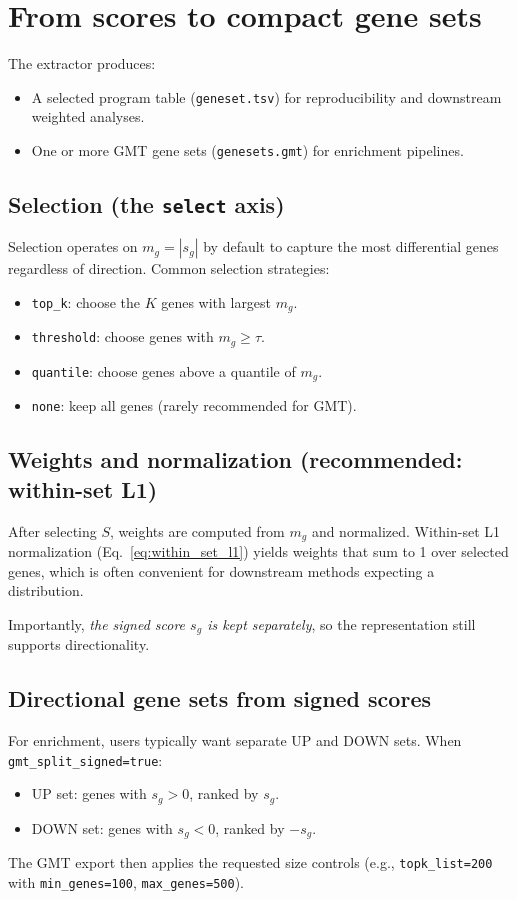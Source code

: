 \documentclass[11pt]{article}
\begin{document}
\section{From scores to compact gene sets}
The extractor produces:
\begin{itemize}[leftmargin=2em]
\item A selected program table (\texttt{geneset.tsv}) for reproducibility and downstream weighted analyses.
\item One or more GMT gene sets (\texttt{genesets.gmt}) for enrichment pipelines.
\end{itemize}

\subsection{Selection (the \texttt{select} axis)}
Selection operates on $m_g = |s_g|$ by default to capture the most differential genes regardless of direction.
Common selection strategies:
\begin{itemize}[leftmargin=2em]
\item \texttt{top\_k}: choose the $K$ genes with largest $m_g$.
\item \texttt{threshold}: choose genes with $m_g \ge \tau$.
\item \texttt{quantile}: choose genes above a quantile of $m_g$.
\item \texttt{none}: keep all genes (rarely recommended for GMT).
\end{itemize}

\subsection{Weights and normalization (recommended: within-set L1)}
After selecting $S$, weights are computed from $m_g$ and normalized.
Within-set L1 normalization (Eq.\ \ref{eq:within_set_l1}) yields weights that sum to 1 over selected genes, which is often convenient for downstream methods expecting a distribution.

Importantly, \emph{the signed score $s_g$ is kept separately}, so the representation still supports directionality.

\subsection{Directional gene sets from signed scores}
For enrichment, users typically want separate UP and DOWN sets.
When \texttt{gmt\_split\_signed=true}:
\begin{itemize}[leftmargin=2em]
\item UP set: genes with $s_g > 0$, ranked by $s_g$.
\item DOWN set: genes with $s_g < 0$, ranked by $-s_g$.
\end{itemize}
The GMT export then applies the requested size controls (e.g., \texttt{topk\_list=200} with \texttt{min\_genes=100}, \texttt{max\_genes=500}).
\end{document}
